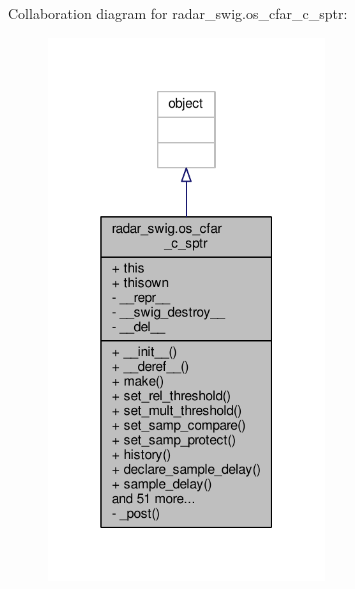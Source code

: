 Collaboration diagram for radar\+\_\+swig.\+os\+\_\+cfar\+\_\+c\+\_\+sptr\+:
\nopagebreak
\begin{figure}[H]
\begin{center}
\leavevmode
\includegraphics[width=208pt]{d5/d81/classradar__swig_1_1os__cfar__c__sptr__coll__graph}
\end{center}
\end{figure}
